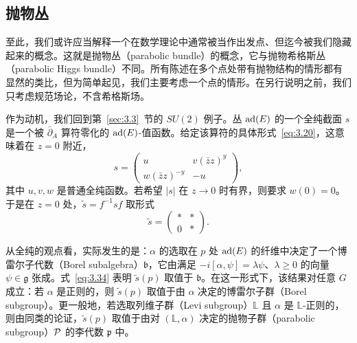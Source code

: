 

\subsection{抛物丛}

\label{sec:3.4}

至此，我们或许应当解释一个在数学理论中通常被当作出发点、但迄今被我们隐藏起来的概念。这就是抛物丛（parabolic bundle）的概念，它与抛物希格斯丛（parabolic Higgs bundle）不同。所有陈述在多个点处带有抛物结构的情形都有显然的类比，但为简单起见，我们主要考虑一个点的情形。在另行说明之前，我们只考虑规范场论，不含希格斯场。

作为动机，我们回到第~\ref{sec:3.3}~节的 $SU(2)$ 例子。丛 ${\rm ad}(E)$ 的一个全纯截面 $s$ 是一个被 $\bar\partial_A$ 算符零化的 ${\rm ad}(E)$-值函数。给定该算符的具体形式~\eqref{eq:3.20}，这意味着在 $z=0$ 附近，
\setcounter{equation}{32}
\begin{equation}\label{eq:3.33}
  s=\left(\begin{matrix}u & v(\bar z z)^{y}\\ w(\bar z z)^{-y} & -u\end{matrix}\right),
\end{equation}
其中 $u,v,w$ 是普通全纯函数。若希望 $|s|$ 在 $z\to 0$ 时有界，则要求 $w(0)=0$。于是在 $z=0$ 处，$\tilde s=f^{-1}sf$ 取形式
\setcounter{equation}{33}
\begin{equation}\label{eq:3.34}
  \tilde s=\left(\begin{matrix}* & * \\ 0 & * \end{matrix}\right).
\end{equation}

{}从全纯的观点看，实际发生的是：$\alpha$ 的选取在 $p$ 处 ${{\rm ad}}(E)$ 的纤维中决定了一个博雷尔子代数（Borel subalgebra）$\mathfrak b$，它由满足 $-i[\alpha,\psi]=\lambda\psi$、$\lambda \geq 0$ 的向量 $\psi\in \mathfrak g$ 张成。式~\eqref{eq:3.34} 表明 $\tilde s(p)$ 取值于 $\mathfrak b$。在这一形式下，该结果对任意 $G$ 成立：若 $\alpha$ 是正则的，则 $\tilde s(p)$ 取值于由 $\alpha$ 决定的博雷尔子群（Borel subgroup）。更一般地，若选取列维子群（Levi subgroup）$\mathbb{L}$ 且 $\alpha$ 是 $\mathbb{L}$-正则的，则由同类的论证，$\tilde s(p)$ 取值于由对 $(\mathbb{L},\alpha)$ 决定的抛物子群（parabolic subgroup）$\mathcal{P}$ 的李代数 $\mathfrak p$ 中。

